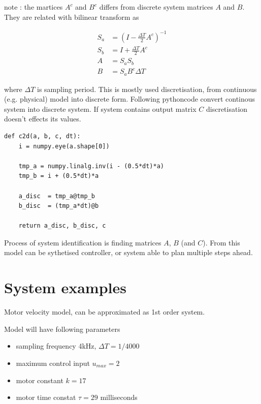 \documentclass[12pt,twoside,onecolumn,openany,extrafontsizes,dvipsnames]{memoir}
\begin{document}
        note : the martices $A^c$ and $B^c$ differs from discrete system matrices $A$ and $B$.
        They are related with bilinear transform as 
        
        \begin{align}
            S_a &= (I - \frac{\Delta T}{2}A^c)^{-1} \\
            S_b &= I + \frac{\Delta T}{2}A^c \\
            A &=  S_aS_b \\
            B &= S_a B^c \Delta T 
        \end{align}

        where $\Delta T$ is sampling period. This is mostly used discretisation, 
        from continuous (e.g. physical) model into discrete form.
        Following pythoncode convert continous system into discrete system. 
        If system contains output matrix $C$ discretisation doesn't effects its values.
       
        \begin{lstlisting}[style=python_style]
def c2d(a, b, c, dt):
    i = numpy.eye(a.shape[0])
    
    tmp_a = numpy.linalg.inv(i - (0.5*dt)*a)
    tmp_b = i + (0.5*dt)*a

    a_disc  = tmp_a@tmp_b
    b_disc  = (tmp_a*dt)@b

    return a_disc, b_disc, c
        \end{lstlisting}
       

        Process of system identification is finding matrices $A$, $B$ (and $C$). From this model 
        can be sythetised controller, or system able to plan multiple steps ahead.

    \section{System examples}   
        Motor velocity model, can be approximated as 1st order system.

        Model will have following parameters

        \begin{itemize}
            \item sampling frequency 4kHz, $\Delta T = 1/4000$
            \item maximum control input $u_{max} = 2$
            \item motor constant $k = 17$
            \item motor time constat $\tau = 29$ milliseconds
        \end{itemize}
\end{document}
